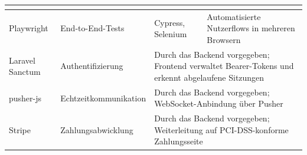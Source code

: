 \begin{table}[htbp]
\begin{tabular}{|p{2.3cm}|p{2.4cm}|p{2.6cm}|p{4.6cm}|}
\cite{vitest_docs} \\
\hline
Playwright & End-to-End-Tests & Cypress, Selenium &
Automatisierte Nutzerflows in mehreren Browsern
\cite{playwright_docs} \\
\hline
Laravel Sanctum & Authenti\-fizierung &
\multicolumn{2}{p{7.6cm}|}{Durch das Backend vorgegeben;
Frontend verwaltet Bearer-Tokens und erkennt abgelaufene
Sitzungen \cite{laravel_sanctum_docs}} \\
\hline
pusher-js & Echtzeit\-kommunikation &
\multicolumn{2}{p{7.6cm}|}{Durch das Backend vorgegeben;
WebSocket-Anbindung über Pusher \cite{pusher_docs}} \\
\hline
Stripe & Zahlungs\-abwicklung &
\multicolumn{2}{p{7.6cm}|}{Durch das Backend vorgegeben;
Weiterleitung auf \acs{PCI-DSS}-konforme Zahlungsseite
\cite{stripe_security_guide}} \\
\hline
\end{tabular}
\end{table}
